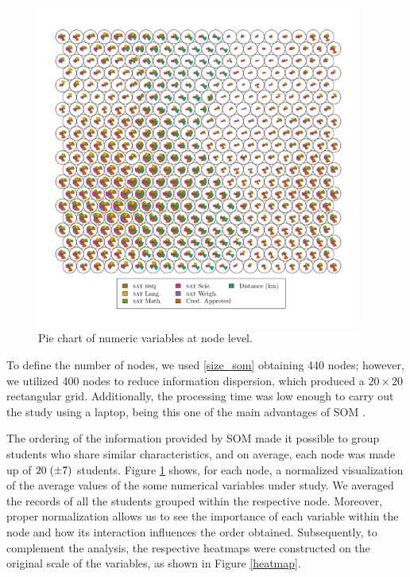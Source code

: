 \documentclass[5p,authoryear,preprint,12pt]{elsarticle}
\begin{document}
\begin{figure}[htb!] 
	\centering
	\includegraphics[trim={0cm 0.8cm 0.5cm 1cm},clip,width=0.95\textwidth]{codes3}
	\caption{Pie chart of numeric variables at node level.}
	\label{piechart}
\end{figure}

To define the number of nodes, we used \eqref{size_som} obtaining 440 nodes; however, we utilized 400 nodes to reduce information dispersion, which produced a $20\times20$ rectangular grid. Additionally, the processing time was low enough to carry out the study using a laptop, being this one of the main advantages of SOM \citep{kohonen2013essentials}.

The ordering of the information provided by SOM made it possible to group students who share similar characteristics, and on average, each node was made up of $20\hspace{0.1cm}(\pm7)$ students. Figure \ref{piechart} shows, for each node, a normalized visualization of the average values of the some numerical variables under study. We averaged the records of all the students grouped within the respective node. Moreover, proper normalization allows us to see the importance of each variable within the node and how its interaction influences the order obtained. Subsequently, to complement the analysis, the respective heatmaps were constructed on the original scale of the variables, as shown in Figure \ref{heatmap}. 
\end{document}

